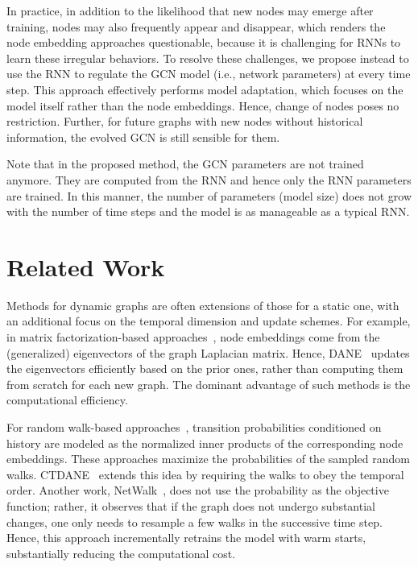\documentclass[letterpaper]{article} %
\begin{document}
In practice, in addition to the likelihood that new nodes may emerge after training, nodes may also frequently appear and disappear, which renders the node embedding approaches questionable, because it is challenging for RNNs to learn these irregular behaviors. To resolve these challenges, we propose instead to use the RNN to regulate the GCN model (i.e., network parameters) at every time step. This approach effectively performs model adaptation, which focuses on the model itself rather than the node embeddings. Hence, change of nodes poses no restriction. Further, for future graphs with new nodes without historical information, the evolved GCN is still sensible for them.

Note that in the proposed method, the GCN parameters are not trained anymore. They are computed from the RNN and hence only the RNN parameters are trained. In this manner, the number of parameters (model size) does not grow with the number of time steps and the model is as manageable as a typical RNN.


\section{Related Work}
Methods for dynamic graphs are often extensions of those for a static one, with an additional focus on the temporal dimension and update schemes. For example, in matrix factorization-based approaches~\cite{Roweis2000,Belkin2002}, node embeddings come from the (generalized) eigenvectors of the graph Laplacian matrix. Hence, DANE~\cite{Li2017} updates the eigenvectors efficiently based on the prior ones, rather than computing them from scratch for each new graph. The dominant advantage of such methods is the computational efficiency.

For random walk-based approaches~\cite{Perozzi2014,Grover2016}, transition probabilities conditioned on history are modeled as the normalized inner products of the corresponding node embeddings. These approaches maximize the probabilities of the sampled random walks. CTDANE~\cite{Nguyen2018} extends this idea by requiring the walks to obey the temporal order. Another work, NetWalk~\cite{Yu2018a}, does not use the probability as the objective function; rather, it observes that if the graph does not undergo substantial changes, one only needs to resample a few walks in the successive time step. Hence, this approach incrementally retrains the model with warm starts, substantially reducing the computational cost.
\end{document}
